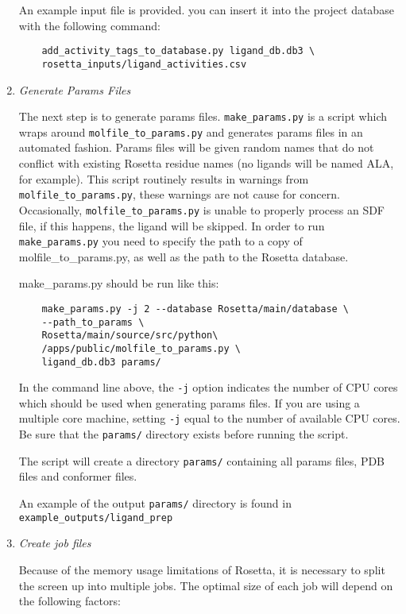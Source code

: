 \begin{enumerate}
	An example input file is provided. you can insert it into the project
	database with the following command:

	\begin{verbatim}
	add_activity_tags_to_database.py ligand_db.db3 \
	rosetta_inputs/ligand_activities.csv
	\end{verbatim}
	\item
	\emph{Generate Params Files}

	The next step is to generate params files. \texttt{make\_params.py} is a script which wraps around \texttt{molfile\_to\_params.py} and generates params files in an automated fashion.
	Params files will be given random names that do not conflict with existing Rosetta residue names (no ligands will be named ALA, for example).
	This script routinely results in warnings from \texttt{molfile\_to\_params.py}, these warnings are not cause for concern.
	Occasionally, \texttt{molfile\_to\_params.py} is unable to properly process an \ac{SDF} file, if this happens, the ligand will be skipped. 
	In order to run \texttt{make\_params.py} you need to specify the path to a copy of molfile\_to\_params.py, as well as the path to the Rosetta database.
	
	make\_params.py should be run like this:

	\begin{verbatim}
	make_params.py -j 2 --database Rosetta/main/database \
	--path_to_params \
	Rosetta/main/source/src/python\
	/apps/public/molfile_to_params.py \
	ligand_db.db3 params/
	\end{verbatim}

	In the command line above, the \texttt{-j} option indicates the number of \ac{CPU} cores which should be used when generating params files.
	If you are using a multiple core machine, setting \texttt{-j} equal to the number of available \ac{CPU} cores.
	Be sure that the \texttt{params/} directory exists before running the script.

	The script will create a directory \texttt{params/} containing all params files, \ac{PDB} files and conformer files.

	An example of the output \texttt{params/} directory is found in\\
	\texttt{example\_outputs/ligand\_prep}
\item
	\emph{Create job files}

	Because of the memory usage limitations of Rosetta, it is necessary to split the screen up into multiple jobs.
	The optimal size of each job will depend on the following factors:


\end{enumerate}
